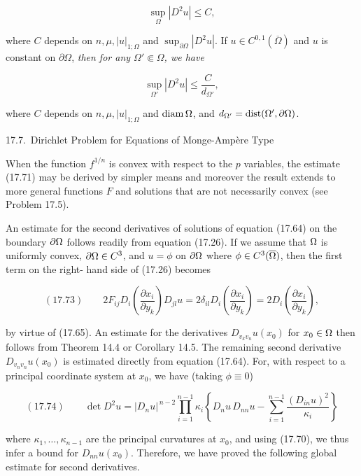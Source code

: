 \begin{equation}\tag{17.71}
\sup_{\Omega} |D^2u| \le C,
\end{equation}

where $C$ depends on $n,\mu,|u|_{1;\Omega}$ and $\sup_{\partial\Omega}|D^2u|$. If $u\in C^{0,1}(\overline{\Omega})$ and $u$ is constant on $\partial\Omega$,
\emph{then for any $\Omega' \Subset \Omega$, we have}

\begin{equation}\tag{17.72}
\sup_{\Omega'} |D^2u| \le \frac{C}{d_{\Omega'}},
\end{equation}

where $C$ depends on $n,\mu,|u|_{1;\Omega}$ and $\operatorname{diam} \Omega$, and $d_{\Omega'} = \operatorname{dist}(\Omega',\partial\Omega)$.


17.7.\ Dirichlet Problem for Equations of Monge-Amp\`ere Type

When the function $f^{1/n}$ is convex with respect to the $p$ variables, the estimate
(17.71) may be derived by simpler means and moreover the result extends to more
general functions $F$ and solutions that are not necessarily convex (see Problem
17.5).

An estimate for the second derivatives of solutions of equation (17.64) on the
boundary $\partial\Omega$ follows readily from equation (17.26). If we assume that $\Omega$ is uniformly
convex, $\partial\Omega\in C^3$, and $u=\phi$ on $\partial\Omega$ where $\phi\in C^3(\overline{\Omega})$, then the first term on the right-
hand side of (17.26) becomes

\[
(17.73)\qquad 2F_{ij}D_i\!\left(\frac{\partial x_i}{\partial y_k}\right)D_{jl}u
= 2\delta_{il}D_i\!\left(\frac{\partial x_i}{\partial y_k}\right)
= 2D_i\!\left(\frac{\partial x_i}{\partial y_k}\right),
\]

by virtue of (17.65). An estimate for the derivatives $D_{v_k v_n}u(x_0)$ for $x_0\in \Omega$ then follows
from Theorem 14.4 or Corollary 14.5. The remaining second derivative $D_{v_n v_n}u(x_0)$ is
estimated directly from equation (17.64). For, with respect to a principal coordinate
system at $x_0$, we have (taking $\phi\equiv 0$)

\[
(17.74)\qquad \det D^2u = |D_nu|^{\,n-2}\prod_{i=1}^{n-1}\kappa_i\left\{D_nu\,D_{nn}u-\sum_{i=1}^{n-1}\frac{(D_{in}u)^2}{\kappa_i}\right\}
\]

where $\kappa_1,\ldots,\kappa_{n-1}$ are the principal curvatures at $x_0$, and using (17.70), we thus
infer a bound for $D_{nn}u(x_0)$. Therefore, we have proved the following global estimate
for second derivatives.

